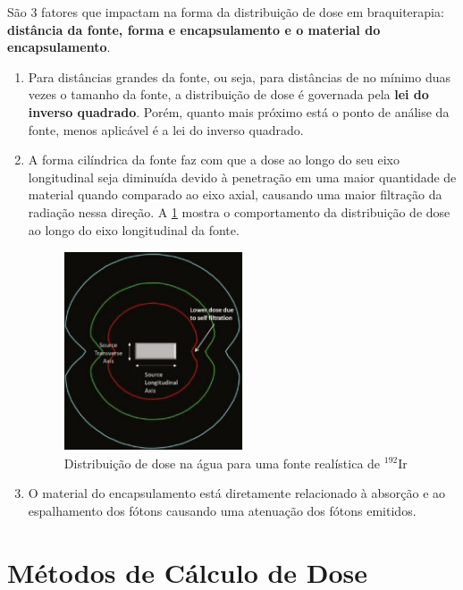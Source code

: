 \documentclass[11pt,a4paper]{article}
\begin{document}
		São 3 fatores que impactam na forma da distribuição de dose em braquiterapia: \textbf{\textcolor{CarnationPink}{distância da fonte, forma e encapsulamento e o material do encapsulamento}}.

		\begin{enumerate}
			\item Para distâncias grandes da fonte, ou seja, para distâncias de no mínimo duas vezes o tamanho da fonte, a distribuição de dose é governada pela \textbf{\textcolor{CarnationPink}{lei do inverso quadrado}}. Porém, quanto mais próximo está o ponto de análise da fonte, menos aplicável é a lei do inverso quadrado.
			
			\item A forma cilíndrica da fonte faz com que a dose ao longo do seu eixo longitudinal seja diminuída devido à penetração em uma maior quantidade de material quando comparado ao eixo axial, causando uma maior filtração da radiação nessa direção. A    \ref{img:distribuicaoDeDose} mostra o comportamento da distribuição de dose ao longo do eixo longitudinal da fonte.
			
				\begin{figure}[h]
					\centering
					\includegraphics[width=0.5\textwidth]{Imagens/distribuicaoDeDose.JPG}
					\caption{Distribuição de dose na água para uma fonte realística de $\mathrm{{}^{192}Ir}$}
					\label{img:distribuicaoDeDose}
				\end{figure}

			\item O material do encapsulamento está diretamente relacionado à absorção e ao espalhamento dos fótons causando uma atenuação dos fótons emitidos.
		\end{enumerate}
	
	\section{Métodos de Cálculo de Dose}
\end{document}
